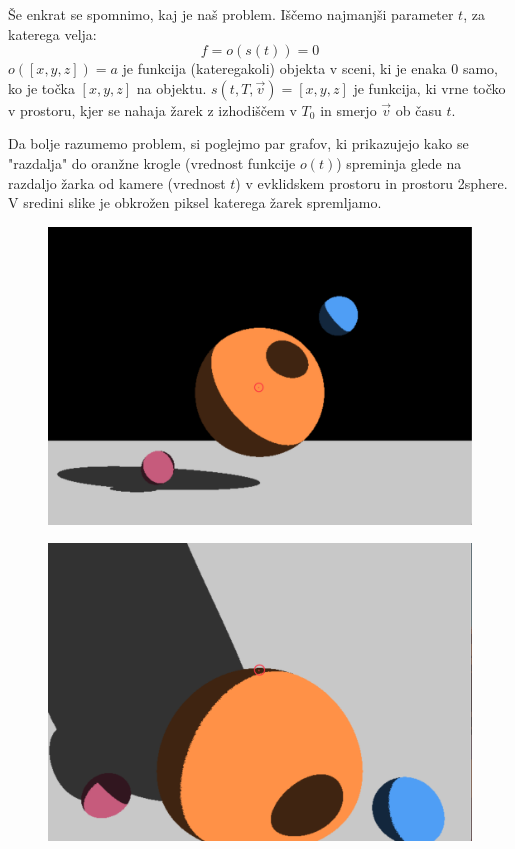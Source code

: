 \documentclass[titlepage]{article}
\begin{document}
Še enkrat se spomnimo, kaj je naš problem. Iščemo najmanjši parameter \( t \), za katerega velja:
\[ f = o(s(t)) = 0 \]
\( o([x, y, z]) = a \) je funkcija (kateregakoli) objekta v sceni, ki je enaka 0 samo, ko je 
točka \([x, y, z]\) na objektu. 
\( s(t, T, \vec{v}) = [x, y, z] \) je funkcija, ki vrne točko v prostoru, kjer se nahaja žarek z izhodiščem v \( T_0\) in smerjo 
\( \vec{v} \) ob času \( t \).


Da bolje razumemo problem, si poglejmo par grafov, ki prikazujejo kako se 
"razdalja" do oranžne krogle (vrednost funkcije \( o(t) \)) spreminja glede na razdaljo žarka od 
kamere (vrednost \( t \)) v evklidskem prostoru in prostoru 2sphere. V sredini slike je obkrožen piksel katerega žarek spremljamo.

\begin{figure}[H]
  \centering
  \begin{minipage}[t]{.4\textwidth}
    \centering
    \includegraphics[width=1\linewidth]{Images/speedup_euclidean_scene.png}
    \label{fig:Speedup euclidean scene}
  \end{minipage}%
  \hspace{0.04\textwidth} %
  \begin{minipage}[t]{.4\textwidth}
    \centering
    \includegraphics[width=1\linewidth]{Images/speedup_2sphere_scene.png}

\end{minipage}
\end{figure}
\end{document}
